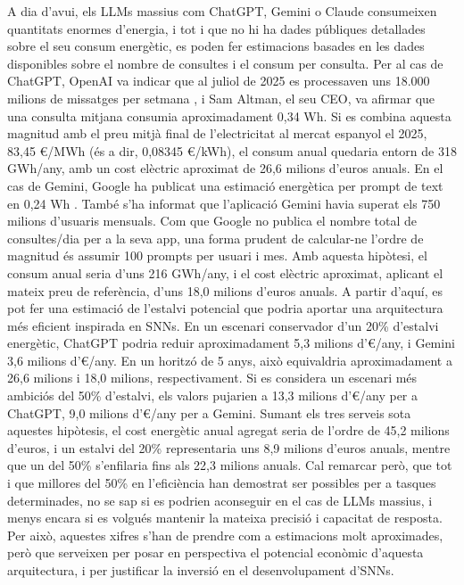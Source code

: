 \documentclass[a4paper,11pt, titlepage, twoside]{article}
\begin{document}
A dia d'avui, els LLMs massius com ChatGPT, Gemini o Claude consumeixen quantitats enormes d'energia, i tot i que no hi ha dades públiques detallades sobre el seu consum energètic, es poden fer estimacions basades en les dades disponibles sobre el nombre de consultes i el consum per consulta. Per al cas de ChatGPT, OpenAI va indicar que al juliol de 2025 es processaven uns 18.000 milions de missatges per setmana \cite{openai_chatgpt_usage_2025}, i Sam Altman, el seu CEO, va afirmar que una consulta mitjana consumia aproximadament 0,34 Wh. Si es combina aquesta magnitud amb el preu mitjà final de l'electricitat al mercat espanyol el 2025, 83,45 €/MWh (és a dir, 0,08345 €/kWh), el consum anual quedaria entorn de 318 GWh/any, amb un cost elèctric aproximat de 26,6 milions d'euros anuals. En el cas de Gemini, Google ha publicat una estimació energètica per prompt de text en 0,24 Wh \cite{google_gemini_energy_2025}. També s'ha informat que l'aplicació Gemini havia superat els 750 milions d'usuaris mensuals. Com que Google no publica el nombre total de consultes/dia per a la seva app, una forma prudent de calcular-ne l'ordre de magnitud és assumir 100 prompts per usuari i mes. Amb aquesta hipòtesi, el consum anual seria d'uns 216 GWh/any, i el cost elèctric aproximat, aplicant el mateix preu de referència, d'uns 18,0 milions d'euros anuals. A partir d'aquí, es pot fer una estimació de l'estalvi potencial que podria aportar una arquitectura més eficient inspirada en SNNs. En un escenari conservador d'un 20\% d'estalvi energètic, ChatGPT podria reduir aproximadament 5,3 milions d'€/any, i Gemini 3,6 milions d'€/any. En un horitzó de 5 anys, això equivaldria aproximadament a 26,6 milions i 18,0 milions, respectivament. Si es considera un escenari més ambiciós del 50\% d'estalvi, els valors pujarien a 13,3 milions d'€/any per a ChatGPT, 9,0 milions d'€/any per a Gemini. Sumant els tres serveis sota aquestes hipòtesis, el cost energètic anual agregat seria de l'ordre de 45,2 milions d'euros, i un estalvi del 20\% representaria uns 8,9 milions d'euros anuals, mentre que un del 50\% s'enfilaria fins als 22,3 milions anuals. Cal remarcar però, que tot i que millores del 50\% en l'eficiència han demostrat ser possibles per a tasques determinades, no se sap si es podrien aconseguir en el cas de LLMs massius, i menys encara si es volgués mantenir la mateixa precisió i capacitat de resposta. Per això, aquestes xifres s'han de prendre com a estimacions molt aproximades, però que serveixen per posar en perspectiva el potencial econòmic d'aquesta arquitectura, i per justificar la inversió en el desenvolupament d'SNNs.
\end{document}
